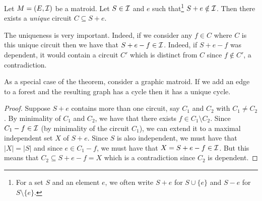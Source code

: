 \documentclass[12pt]{article}
\begin{document}
\begin{theorem} \label{uniquecir}
  Let $M=(E, {\cal I})$ be a matroid. Let $S\in {\cal I}$ and $e$ such
  that\footnote{For a set $S$ and an element $e$, we often write $S+e$
    for $S\cup\{e\}$ and $S-e$ for $S\setminus \{e\}$.} $S+e\notin
  {\cal I}$. Then there exists a {\it unique} circuit $C\subseteq
  S+e$.
\end{theorem}

The uniqueness is very important. Indeed, if we consider any $f\in C$
where $C$ is this unique circuit then we have that $S+e-f\in {\cal
  I}$. Indeed, if $S+e-f$ was dependent, it would contain a circuit
$C'$ which is distinct from $C$ since $f\notin C'$, a contradiction.

As a special case of the theorem, consider a graphic matroid. If we
add an edge to a forest and the resulting graph has a cycle then it
has a unique cycle.

\begin{proof}

Suppose $S+e$ contains more than one circuit, say $C_1$ and $C_2$ with
$C_1\neq C_2$. By minimality of $C_1$ and $C_2$, we have that there
exists $f\in C_1\setminus C_2$. Since
$C_1-f\in {\cal I}$ (by minimality of the circuit $C_1$), we can
extend it to a maximal independent set $X$ of $S+e$. Since $S$ is
also independent, we must have that $|X|=|S|$ and since $e\in C_1-f$, we
must have that $X=S+e-f\in {\cal I}$. But this means that
$C_2\subseteq S+e-f=X$ which is a contradiction since $C_2$ is
dependent. 
\end{proof}
\end{document}
